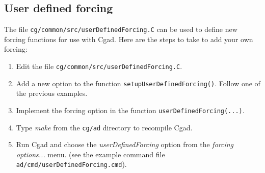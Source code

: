 \documentclass[11pt]{article}
\begin{document}
\subsection{User defined forcing} \label{sec:userDefinedForcing}


The file {\tt cg/common/src/userDefinedForcing.C} can be used to define new forcing functions
for use with Cgad. Here are the steps to take to add your own forcing:
\begin{enumerate}
  \item Edit the file  {\tt cg/common/src/userDefinedForcing.C}.
  \item Add a new option to the function {\tt setupUserDefinedForcing()}. Follow one of the previous
         examples. 
  \item Implement the forcing option in the function {\tt userDefinedForcing(...)}.
  \item Type {\em make} from the {\tt cg/ad} directory to recompile Cgad.
  \item Run Cgad and choose the {\em userDefinedForcing} option from the {\em forcing options...} menu.
    (see the example command file {\tt ad/cmd/userDefinedForcing.cmd}).
\end{enumerate}

\end{document}

